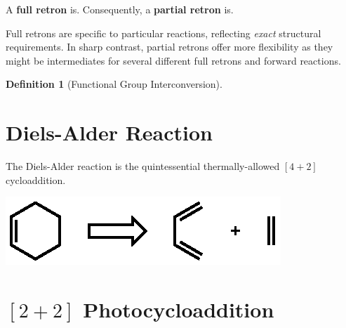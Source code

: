 \documentclass[a4paper]{tufte-handout}
\newtheorem{definition}{Definition}
\begin{document}
A \textbf{full retron} is. Consequently, a \textbf{partial retron} is.

Full retrons are specific to particular reactions, reflecting \textit{exact} structural
requirements. In sharp contrast, partial retrons offer more flexibility
as they might be intermediates for several different full retrons and 
forward reactions.

\begin{definition}[Functional Group Interconversion]
  
\end{definition}

\section*{Diels-Alder Reaction}

The Diels-Alder reaction is the quintessential thermally-allowed $[4+2]$ cycloaddition.

\begin{marginfigure}%
  \includegraphics[width=\linewidth]{diels-alder-transform}
  \caption{Diels-Alder transform. Shown here is the simplest Diels-Alder reaction: the formation of cyclohexene from 1,3-butadiene and ethylene.}
  \label{fig:marginfig}
\end{marginfigure}

\section*{$[2+2]$ Photocycloaddition}



\end{document}
